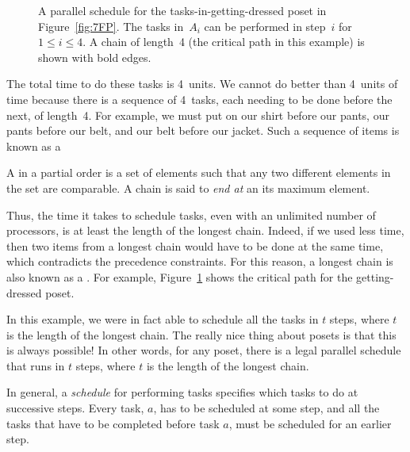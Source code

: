 \begin{figure}


\caption{A parallel schedule for the tasks-in-getting-dressed poset in
Figure~\ref{fig:7FP}.  The tasks in~$A_i$ can be performed in step~$i$
for $1 \le i \le 4$.  A chain of length~4 (the critical path in this
example) is shown with bold edges.}

\label{fig:7FS}

\end{figure}

The total time to do these tasks is 4~units.  We cannot do better than
4~units of time because there is a sequence of 4~tasks, each needing
to be done before the next, of length~4.  For example, we must put on
our shirt before our pants, our pants before our belt, and our belt
before our jacket.  Such a sequence of items is known as a

\begin{definition}\label{def:chain}
A  in a partial order is a set of elements such that any
two different elements in the set are comparable.  A chain is said to
\emph{end at} an its maximum element.
\end{definition}

Thus, the time it takes to schedule tasks, even with an unlimited
number of processors, is at least the length of the longest chain.
Indeed, if we used less time, then two items from a longest chain
would have to be done at the same time, which contradicts the
precedence constraints.  For this reason, a longest chain is also
known as a .  For example, Figure~\ref{fig:7FS}
shows the critical path for the getting-dressed poset.

In this example, we were in fact able to schedule all the tasks in $t$
steps, where $t$ is the length of the longest chain.  The really nice
thing about posets is that this is always possible!  In other words,
for any poset, there is a legal parallel schedule that runs in $t$
steps, where $t$ is the length of the longest chain.

In general, a \emph{schedule} for performing tasks specifies which
tasks to do at successive steps.  Every task, $a$, has to be scheduled
at some step, and all the tasks that have to be completed before task
$a$, must be scheduled for an earlier step.

